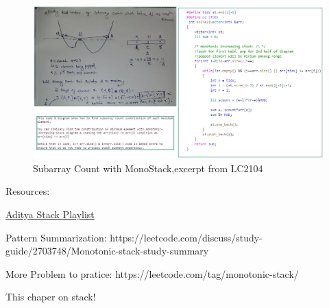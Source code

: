 \begin{fullwidth}
\begin{figure}[h]
    \caption{Subarray Count with MonoStack,excerpt from LC2104}
    \includegraphics[width=\dimexpr\textwidth+\marginparwidth\relax]{resources/monotonic-stack-subarray-count.jpg}
\end{figure}

\end{fullwidth}

\clearpage




Resources:
\begin{compactenum}
\item \href{https://www.youtube.com/playlist?list=PL_z_8CaSLPWdeOezg68SKkeLN4-T_jNHd}{Aditya Stack Playlist}
\item Pattern Summarization: https://leetcode.com/discuss/study-guide/2703748/Monotonic-stack-study-summary
\item  More Problem to pratice: https://leetcode.com/tag/monotonic-stack/
\item This chaper on stack!
\end{compactenum}


